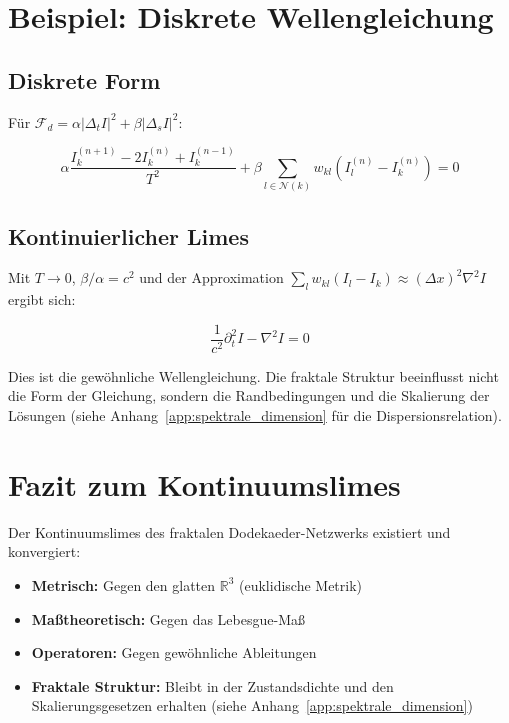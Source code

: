 \section{Beispiel: Diskrete Wellengleichung}
\label{app:kontinuumslimes_wellengleichung}

\subsection{Diskrete Form}
\label{sub:kontinuumslimes_welle_diskret}

Für \( \mathcal{F}_d = \alpha|\Delta_t I|^2 + \beta|\Delta_s I|^2 \):

\[
\alpha \frac{I_k^{(n+1)} - 2I_k^{(n)} + I_k^{(n-1)}}{T^2} +
\beta \sum_{l \in \mathcal{N}(k)} w_{kl}(I_l^{(n)} - I_k^{(n)}) = 0
\]

\subsection{Kontinuierlicher Limes}
\label{sub:kontinuumslimes_welle_kont}

Mit \( T \to 0 \), \( \beta/\alpha = c^2 \) und der Approximation \( \sum_l w_{kl}(I_l - I_k) \approx (\Delta x)^2 \nabla^2 I \) ergibt sich:

\[
\frac{1}{c^2} \partial_t^2 I - \nabla^2 I = 0
\]

Dies ist die gewöhnliche Wellengleichung. Die fraktale Struktur beeinflusst nicht die Form der Gleichung, sondern die Randbedingungen und die Skalierung der Lösungen (siehe Anhang~\ref{app:spektrale_dimension} für die Dispersionsrelation).

\section{Fazit zum Kontinuumslimes}
\label{app:kontinuumslimes_fazit}

Der Kontinuumslimes des fraktalen Dodekaeder-Netzwerks existiert und konvergiert:

\begin{itemize}
    \item \textbf{Metrisch:} Gegen den glatten \( \mathbb{R}^3 \) (euklidische Metrik)
    \item \textbf{Maßtheoretisch:} Gegen das Lebesgue-Maß
    \item \textbf{Operatoren:} Gegen gewöhnliche Ableitungen
    \item \textbf{Fraktale Struktur:} Bleibt in der Zustandsdichte und den Skalierungsgesetzen erhalten (siehe Anhang~\ref{app:spektrale_dimension})
\end{itemize}

